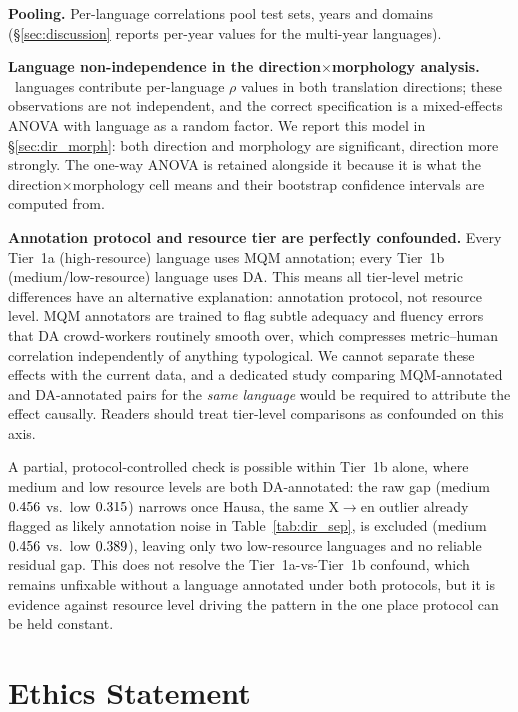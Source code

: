 \documentclass[11pt]{article}
\begin{document}
\textbf{Pooling.} Per-language correlations pool test sets, years and domains (\S\ref{sec:discussion} reports per-year values for the multi-year languages).

\textbf{Language non-independence in the direction$\times$morphology analysis.} \NumMixedLangs\ languages contribute per-language $\rho$ values in both translation directions; these observations are not independent, and the correct specification is a mixed-effects ANOVA with language as a random factor. We report this model in \S\ref{sec:dir_morph}: both direction and morphology are significant, direction more strongly. The one-way ANOVA is retained alongside it because it is what the direction$\times$morphology cell means and their bootstrap confidence intervals are computed from.

\textbf{Annotation protocol and resource tier are perfectly confounded.} Every Tier~1a (high-resource) language uses MQM annotation; every Tier~1b (medium/low-resource) language uses DA. This means all tier-level metric differences have an alternative explanation: annotation protocol, not resource level. MQM annotators are trained to flag subtle adequacy and fluency errors that DA crowd-workers routinely smooth over, which compresses metric--human correlation independently of anything typological. We cannot separate these effects with the current data, and a dedicated study comparing MQM-annotated and DA-annotated pairs for the \emph{same language} would be required to attribute the effect causally. Readers should treat tier-level comparisons as confounded on this axis.

A partial, protocol-controlled check is possible within Tier~1b alone, where medium and low resource levels are both DA-annotated: the raw gap (medium $0.456$ vs.\ low $0.315$) narrows once Hausa, the same X$\to$en outlier already flagged as likely annotation noise in Table~\ref{tab:dir_sep}, is excluded (medium $0.456$ vs.\ low $0.389$), leaving only two low-resource languages and no reliable residual gap. This does not resolve the Tier~1a-vs-Tier~1b confound, which remains unfixable without a language annotated under both protocols, but it is evidence against resource level driving the pattern in the one place protocol can be held constant.

\section*{Ethics Statement}
\end{document}
